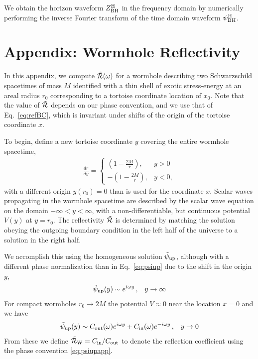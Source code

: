 \begin{refsection}
We obtain the horizon waveform $Z^{\rm H}_{\rm BH}$ in the frequency domain by numerically performing the inverse Fourier transform of the time domain waveform $\psi_{\rm BH}^{\rm H}$.


\section{Appendix: Wormhole Reflectivity}
\label{sec:wormdetails}

In this appendix, we compute $\tilde{\mathcal R}(\omega)$ for a wormhole \cite{Cardoso:2016rao} describing two Schwarzschild spacetimes of mass $M$ identified with a thin shell of exotic stress-energy at an areal radius $r_0$ corresponding to a tortoise coordinate location of $x_0$. 
Note that the value of $\tilde{\mathcal R}$ depends on our phase convention, and we use that of Eq.~\eqref{eq:refBC}, which is invariant under shifts of the origin of the tortoise coordinate $x$. 

To begin, define a new tortoise coordinate $y$ covering the entire wormhole spacetime, 
\begin{align}
\frac{dr}{dy}=\begin{cases}
\displaystyle
\left(1-\frac{2M}{r}\right), & y > 0 \\
\displaystyle
-\left(1-\frac{2M}{r}\right), & y <0,
\end{cases}
\end{align}
with a different origin $y(r_0)=0$ than
is used for the coordinate $x$. 
Scalar waves propagating in the wormhole spacetime are described by the scalar wave equation on the domain $-\infty<y<\infty$, with a non-differentiable, but continuous potential $V(y)$ at $y=r_0$. 
The reflectivity $\tilde{\mathcal R}$ is determined by matching the  solution obeying the outgoing boundary condition in the left half of the universe to a solution in the right half.

We accomplish this using the homogeneous solution $\tilde \psi_{\rm up}$, although with a different phase normalization than in Eq.~\eqref{eq:psiup} due to the shift in the origin $y$,
\begin{align}
\tilde \psi_{\rm up}(y) & \sim 
e^{i\omega y} \,, & y \to \infty \label{eq:psiupapp}
\end{align}
For compact wormholes $r_0\to 2M$ the potential $V\approx 0$ near the location $x= 0$ and we have
\begin{align}
 \label{eq:psiupzero}
\tilde \psi_{\rm up}(y) & \sim 
C_{\rm out}(\omega) e^{i \omega y} + C_{\rm in}(\omega) e^{-i\omega y}\,, & y \to 0
\end{align} 
From these we define $\tilde{\mathcal R}_{\rm W}=C_{\rm in}/C_{\rm out}$
to denote the reflection coefficient using the phase convention \eqref{eq:psiupapp}. 


\end{refsection}
